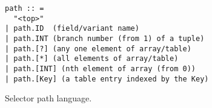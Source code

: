 

    
\begin{figure}
{\small
\begin{verbatim}
path :: =  
  "<top>"
| path.ID  (field/variant name)
| path.INT (branch number (from 1) of a tuple)
| path.[?] (any one element of array/table) 
| path.[*] (all elements of array/table) 
| path.[INT] (nth element of array (from 0))
| path.[Key] (a table entry indexed by the Key)
\end{verbatim}
}
\caption{Selector path language.}
\label{fig:selector-lang}
\end{figure}


